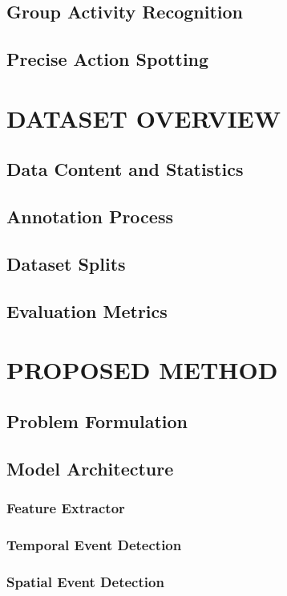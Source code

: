 \documentclass[a4paper,twoside]{article}
\begin{document}
\subsection{Group Activity Recognition}


\subsection{Precise Action Spotting}


\section{\uppercase{DATASET OVERVIEW}}
\subsection{Data Content and Statistics}
\subsection{Annotation Process}
\subsection{Dataset Splits}
\subsection{Evaluation Metrics}

\section{\uppercase{PROPOSED METHOD}}
\subsection{Problem Formulation}
\subsection{Model Architecture}
\subsubsection{Feature Extractor}
\subsubsection{Temporal Event Detection}
\subsubsection{Spatial Event Detection}
\end{document}
